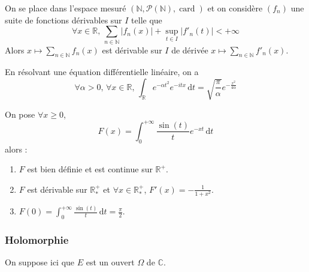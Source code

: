 
  \begin{example}
    On se place dans l'espace mesuré $(\mathbb{N}, \mathcal{P}(\mathbb{N}), \operatorname{card})$ et on considère $(f_n)$ une suite de fonctions dérivables sur $I$ telle que
    \[ \forall x \in \mathbb{R}, \, \sum_{n \in \mathbb{N}} |f_n(x)| + \sup_{t \in I} |f'_n(t)| < +\infty \]
    Alors $x \mapsto \sum_{n \in \mathbb{N}} f_n(x)$ est dérivable sur $I$ de dérivée $x \mapsto \sum_{n \in \mathbb{N}} f'_n(x)$.
  \end{example}


  \begin{application}
    En résolvant une équation différentielle linéaire, on a
    \[ \forall \alpha > 0, \, \forall x \in \mathbb{R}, \, \int_{\mathbb{R}} e^{-\alpha t^2} e^{-itx} \, \mathrm{d}t = \sqrt{\frac{\pi}{\alpha}} e^{-\frac{x^2}{4 \alpha}} \]
  \end{application}


  \begin{application}
    On pose $\forall x \geq 0$,
    \[ F(x) = \int_0^{+\infty} \frac{\sin(t)}{t} e^{-xt} \, \mathrm{d}t \]
    alors :
    \begin{enumerate}[label={\bfseries(\roman*)}]
      \item $F$ est bien définie et est continue sur $\mathbb{R}^+$.
      \item $F$ est dérivable sur $\mathbb{R}^+_*$ et $\forall x \in \mathbb{R}^+_*$, $F'(x) = -\frac{1}{1+x^2}$.
      \item $F(0) = \int_0^{+\infty} \frac{\sin(t)}{t} \, \mathrm{d}t = \frac{\pi}{2}$.
    \end{enumerate}
  \end{application}

  \subsubsection{Holomorphie}


  On suppose ici que $E$ est un ouvert $\Omega$ de $\mathbb{C}$.

